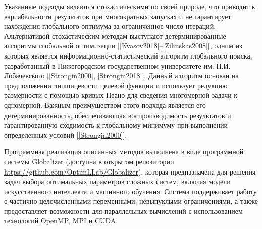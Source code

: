 \documentclass[10pt,a4paper]{book}
\begin{document}


 Указанные подходы являются стохастическими по своей природе, что приводит к вариабельности результатов при многократных запусках и не гарантирует нахождения глобального оптимума за ограниченное число итераций. Альтернативой стохастическим методам выступают детерминированные алгоритмы глобальной оптимизации [\ref{Kvasov2018}--\ref{Zilinskas2008}], одним из которых является информационно-статистический алгоритм глобального поиска, разработанный в Нижегородском государственном университете им. Н.И. Лобачевского [\ref{Strongin2000}, \ref{Strongin2018}]. Данный алгоритм основан на предположении липшицевости целевой функции и использует редукцию размерности с помощью кривых Пеано для сведения многомерной задачи к одномерной. Важным преимуществом этого подхода является его детерминированность, обеспечивающая воспроизводимость результатов и гарантированную сходимость к глобальному минимуму при выполнении определенных условий [\ref{Strongin2000}].

Программная реализация описанных методов выполнена в виде программной системы Globalizer (доступна в открытом репозитории \url{https://github.com/OptimLLab/Globalizer}), которая предназначена для решения задач выбора оптимальных параметров сложных систем, включая модели искусственного интеллекта и машинного обучения. Система поддерживает работу с частично целочисленными переменными, невыпуклыми ограничениями, а также предоставляет возможности для параллельных вычислений с использованием технологий OpenMP, MPI и CUDA.
\end{document}
